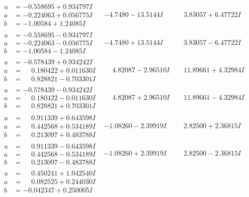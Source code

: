\documentclass[1p]{elsarticle_modified}
\theoremstyle{definition}
\begin{document}
$$\begin{array}{c|c|c}
\begin{aligned}
u &= -0.558695 + 0.934797 I \\
a &= -0.224063 + 0.056775 I \\
b &= -1.00584 + 1.24085 I\end{aligned}
 & -4.7480 - 13.5144 I & \phantom{-}3.83057 + 6.47722 I \\ \hline\begin{aligned}
u &= -0.558695 - 0.934797 I \\
a &= -0.224063 - 0.056775 I \\
b &= -1.00584 - 1.24085 I\end{aligned}
 & -4.7480 + 13.5144 I & \phantom{-}3.83057 - 6.47722 I \\ \hline\begin{aligned}
u &= -0.578439 + 0.934242 I \\
a &= \phantom{-}0.180422 + 0.011630 I \\
b &= \phantom{-}0.828821 - 0.703301 I\end{aligned}
 & \phantom{-}4.82087 - 2.96510 I & \phantom{-}11.89661 + 4.32984 I \\ \hline\begin{aligned}
u &= -0.578439 - 0.934242 I \\
a &= \phantom{-}0.180422 - 0.011630 I \\
b &= \phantom{-}0.828821 + 0.703301 I\end{aligned}
 & \phantom{-}4.82087 + 2.96510 I & \phantom{-}11.89661 - 4.32984 I \\ \hline\begin{aligned}
u &= \phantom{-}0.911339 + 0.643598 I \\
a &= \phantom{-}0.442568 + 0.534189 I \\
b &= \phantom{-}0.213097 + 0.483788 I\end{aligned}
 & -1.08260 - 2.39919 I & \phantom{-}2.82500 + 2.36815 I \\ \hline\begin{aligned}
u &= \phantom{-}0.911339 - 0.643598 I \\
a &= \phantom{-}0.442568 - 0.534189 I \\
b &= \phantom{-}0.213097 - 0.483788 I\end{aligned}
 & -1.08260 + 2.39919 I & \phantom{-}2.82500 - 2.36815 I \\ \hline\begin{aligned}
u &= \phantom{-}0.450241 + 1.042540 I \\
a &= \phantom{-}0.082525 + 0.244030 I \\
b &= -0.042347 + 0.250005 I\end{aligned}

\end{array}$$
\end{document}
